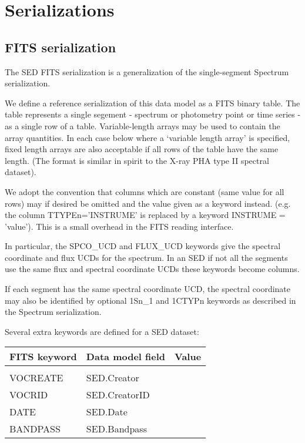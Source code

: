 \documentclass[11pt]{article}
\begin{document}
\section{Serializations}

\subsection{FITS serialization}

The SED FITS serialization is a generalization of the single-segment
Spectrum serialization.

We define a reference serialization of this data model as a FITS binary table.
The table represents a single segement - spectrum or photometry point 
or time series - as a single row of a table.
Variable-length arrays may be used to contain the array quantities.
In each case below where a `variable length array' is specified,
fixed length arrays are
also acceptable if all rows of the table have the same length.
(The format is similar in spirit to the X-ray PHA type II spectral dataset).

We adopt the convention that columns which are constant (same value for all rows)
may if desired be omitted and the value given as a keyword instead. (e.g. the column
TTYPEn='INSTRUME'  is replaced by a keyword  INSTRUME = 'value'). This is a
small overhead in the FITS reading interface.

In particular, the SPCO\_UCD and FLUX\_UCD keywords give the spectral coordinate and flux
UCDs for the spectrum. 
In an SED if not all the segments use the same flux and spectral coordinate
UCDs these keywords become columns.

If each segment has the same spectral coordinate UCD, the spectral coordinate 
may also be identified by optional 1Sn\_1 and 1CTYPn keywords
as described in the Spectrum serialization.

Several extra keywords are defined for a SED dataset:

\vskip 0.2in
\colorbox{ipink}{\small
\begin{minipage}[l]{5.0in}
\begin{tabular}{lll} 
FITS keyword  & Data model field   & Value \\
\hline
 & & \\
 
VOCREATE      & SED.Creator \\
 
VOCRID        & SED.CreatorID \\
 
DATE          & SED.Date \\
 
BANDPASS      & SED.Bandpass \\

 
\end{tabular}
\end{minipage}
}
\vskip 0.1in
\end{document}
